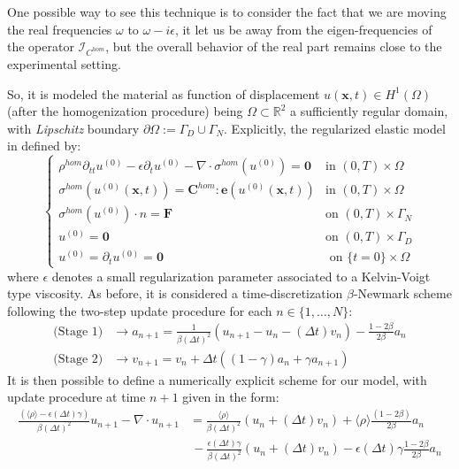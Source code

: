\begin{rem}
One possible way to see this technique is to consider the fact that we are moving the real frequencies $\omega$ to $\omega - i\epsilon$, it let us be away from the eigen-frequencies of the operator $\mathcal{I}_{C^{hom}}$, but the overall behavior of the real part remains close to the experimental setting.
\end{rem}

So, it is modeled the material as function of displacement $u(\mathbf{x},t) \in H^{1}(\Omega)$ (after the homogenization procedure) being $\Omega \subset \mathbb{R}^2$ a sufficiently regular domain, with \textit{Lipschitz} boundary $\partial \Omega := \Gamma_D \cup \Gamma_N$. 
Explicitly, the regularized elastic model in defined by:
\begin{equation*}
    \left \{
    \begin{array}{cc}
        \rho^{hom} \partial_{tt} u^{(0)} - \epsilon \partial_{t} u^{(0)} - \nabla \cdot \sigma^{hom}(u^{(0)}) = \mathbf{0} & \text{in } (0,T)\times \Omega\\
        \sigma^{hom}(u^{(0)}(\mathbf{x},t)) =  \mathbf{C}^{hom}:\mathbf{e}(u^{(0)}(\mathbf{x},t))  & \text{in }(0,T)\times \Omega\\ 
        \sigma^{hom}(u^{(0)})\cdot n = \mathbf{F} & \text{on } (0,T)\times \Gamma_N\\
        u^{(0)} = \mathbf{0} & \text{on }(0,T)\times \Gamma_D \\
        u^{(0)} = \partial_t u^{(0)} = \mathbf{0}& \text{ on } \{t=0\}\times\Omega
    \end{array}
    \right .
\end{equation*}
where $\epsilon$ denotes a small regularization parameter associated to a Kelvin-Voigt type viscosity. 
As before, it is considered a time-discretization $\beta$-Newmark scheme following the two-step update procedure for each $n \in \{1,\dots, N\}$:
\begin{align*}
    \text{(Stage 1)} &\longrightarrow a_{n+1} = \frac{1}{\beta (\Delta t)^2} (u_{n+1}-u_{n}-(\Delta t)v_n) - \frac{1-2\beta}{2\beta}a_n\\
    \text{(Stage 2)}& \longrightarrow v_{n+1} = v_n + \Delta t((1-\gamma)a_n + \gamma a_{n+1})
\end{align*}
It is then possible to define a numerically explicit scheme for our model, with update procedure at time $n+1$ given in the form:
\begin{align*}
    \frac{(\langle \rho \rangle- \epsilon (\Delta t) \gamma)}{\beta (\Delta t)^2} u_{n+1} - \nabla \cdot u_{n+1} &= \frac{\langle \rho \rangle}{\beta (\Delta t)^2} (u_n + (\Delta t)v_n) + \langle \rho \rangle\frac{ (1-2\beta)}{2\beta}a_n \\
    & \, - \frac{\epsilon (\Delta t)\gamma}{\beta (\Delta t)^2}(u_n + (\Delta t)v_n) - \epsilon (\Delta t)\gamma\frac{1-2\beta}{2 \beta} a_n
\end{align*}

